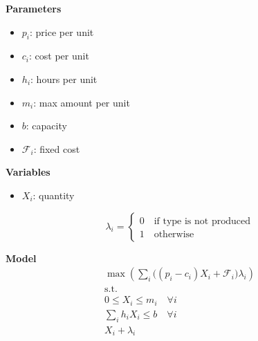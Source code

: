 \documentclass[10pt]{article}
\begin{document}
\textbf{Parameters}
\begin{itemize}
    \item $p_i $: price per unit 
    \item $c_i $: cost per unit 
    \item $h_i $: hours per unit
    \item $m_i $: max amount per unit
    \item $b $: capacity 
    \item $\mathcal{F}_i$: fixed cost
\end{itemize}

\textbf{Variables}
\begin{itemize}
    \item $X_i$: quantity
\end{itemize}

\[
\lambda_i = 
\begin{cases}
    0\quad\text{if type is not produced}\\
    1\quad\text{otherwise}
\end{cases}
\]

\textbf{Model}
\begin{gather*}
    \max\left(\sum_i \big((p_i - c_i)X_i + \mathcal{F}_i\big)\lambda_i\right)\\
    \text{s.t.}\\
    0 \le X_i \le m_i\quad\forall i \\
    \sum_i h_iX_i \le b\quad\forall i\\
    X_i + \lambda_i
\end{gather*}
\end{document}
